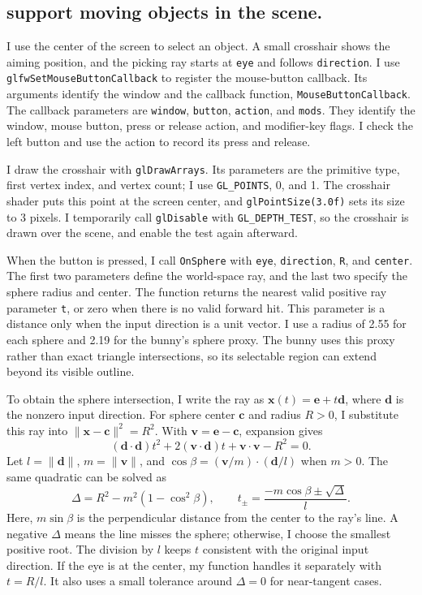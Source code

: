 \documentclass[acmtog]{acmart}
\begin{document}
\subsection{support moving objects in the scene.}
I use the center of the screen to select an object. A small crosshair shows the aiming position, and the picking ray starts at \texttt{eye} and follows \texttt{direction}. I use \texttt{glfwSetMouseButtonCallback} to register the mouse-button callback. Its arguments identify the window and the callback function, \texttt{MouseButtonCallback}. The callback parameters are \texttt{window}, \texttt{button}, \texttt{action}, and \texttt{mods}. They identify the window, mouse button, press or release action, and modifier-key flags. I check the left button and use the action to record its press and release.

I draw the crosshair with \texttt{glDrawArrays}. Its parameters are the primitive type, first vertex index, and vertex count; I use \texttt{GL\_POINTS}, 0, and 1. The crosshair shader puts this point at the screen center, and \texttt{glPointSize(3.0f)} sets its size to 3 pixels. I temporarily call \texttt{glDisable} with \texttt{GL\_DEPTH\_TEST}, so the crosshair is drawn over the scene, and enable the test again afterward.

When the button is pressed, I call \texttt{OnSphere} with \texttt{eye}, \texttt{direction}, \texttt{R}, and \texttt{center}. The first two parameters define the world-space ray, and the last two specify the sphere radius and center. The function returns the nearest valid positive ray parameter \texttt{t}, or zero when there is no valid forward hit. This parameter is a distance only when the input direction is a unit vector. I use a radius of 2.55 for each sphere and 2.19 for the bunny's sphere proxy. The bunny uses this proxy rather than exact triangle intersections, so its selectable region can extend beyond its visible outline.

To obtain the sphere intersection, I write the ray as $\mathbf x(t)=\mathbf e+t\mathbf d$, where $\mathbf d$ is the nonzero input direction. For sphere center $\mathbf c$ and radius $R>0$, I substitute this ray into $\|\mathbf x-\mathbf c\|^2=R^2$. With $\mathbf v=\mathbf e-\mathbf c$, expansion gives
\begin{equation}
(\mathbf d\cdot\mathbf d)t^2+
2(\mathbf v\cdot\mathbf d)t+
\mathbf v\cdot\mathbf v-R^2=0.
\end{equation}
Let $l=\|\mathbf d\|$, $m=\|\mathbf v\|$, and $\cos\beta=(\mathbf v/m)\cdot(\mathbf d/l)$ when $m>0$. The same quadratic can be solved as
\begin{equation}
\Delta=R^2-m^2(1-\cos^2\beta),
\qquad t_\pm=\frac{-m\cos\beta\pm\sqrt{\Delta}}{l}.
\end{equation}
Here, $m\sin\beta$ is the perpendicular distance from the center to the ray's line. A negative $\Delta$ means the line misses the sphere; otherwise, I choose the smallest positive root. The division by $l$ keeps $t$ consistent with the original input direction. If the eye is at the center, my function handles it separately with $t=R/l$. It also uses a small tolerance around $\Delta=0$ for near-tangent cases.
\end{document}
